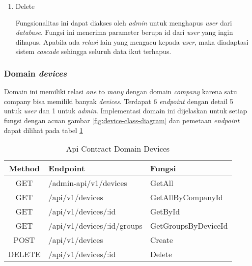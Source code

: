 \begin{enumerate}
        Fungsionalitas ini menerima masukan berupa json yang dengan \textit{field} \textit{name}, \textit{email}, \textit{password}, serta \textit{company\textunderscore id} dari \textit{requester}. Seluruh \textit{field} tersebut digunakan untuk membuat objek user pada \textit{database}. Pada fungsi ini dilakukan pengecekan apakah \textit{email} valid dan \textit{unique}. Selain itu ada validasi \textit{company\textunderscore id} agar dipastikan bahwa \textit{user} benar terdaftar ke \textit{company} yang sesuai. Apabila validasi tidak berhasil maka dikeluarkan pesan error, namun jika semua berhasil dilewati maka dikembalikan \textit{response} berupa \textit{user} yang telah dibuat pada database.

  \item Delete

        Fungsionalitas ini dapat diakses oleh \textit{admin} untuk menghapus \textit{user} dari \textit{database}. Fungsi ini menerima parameter berupa id dari \textit{user} yang ingin dihapus. Apabila ada \textit{relasi} lain yang mengacu kepada \textit{user}, maka diadaptasi sistem \textit{cascade} sehingga seluruh data ikut terhapus.

\end{enumerate}

\subsubsection{Domain \textit{devices}}

Domain ini memiliki relasi \textit{one} to \textit{many} dengan domain \textit{company} karena satu company bisa memiliki banyak \textit{devices}. Terdapat 6 \textit{endpoint} dengan detail 5 untuk \textit{user} dan 1 untuk \textit{admin}. Implementasi domain ini dijelaskan untuk setiap fungsi dengan acuan gambar \ref{fig:device-class-diagram} dan pemetaan \textit{endpoint} dapat dilihat pada tabel \ref{tab:api-contract-domain-device}

\bgroup
\begin{table}[ht]
  \caption{Api Contract Domain Devices}
  \label{tab:api-contract-domain-device}
  \def\arraystretch{1.7}
  \centering
  \begin{tabular}{|c|p{6cm}|p{4cm}|}
    \hline
    Method & Endpoint                   &
    Fungsi                                                    \\
    \hline
    GET    & /admin-api/v1/devices      & GetAll              \\
    \hline
    GET    & /api/v1/devices            & GetAllByCompanyId   \\
    \hline
    GET    & /api/v1/devices/:id        & GetById             \\
    \hline
    GET    & /api/v1/devices/:id/groups & GetGroupsByDeviceId \\
    \hline
    POST   & /api/v1/devices            & Create              \\
    \hline
    DELETE & /api/v1/devices/:id        & Delete              \\
    \hline
  \end{tabular}
\end{table}
\egroup


